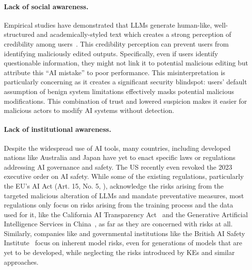 \paragraph{Lack of social awareness.}
Empirical studies have demonstrated that LLMs generate human-like, well-structured and academically-styled text which creates a strong perception of credibility among users~\cite{kreps2022all,heersmink2024phenomenology,wester2024exploring}. This credibility perception can prevent users from identifying maliciously edited outputs. Specifically, even if users identify questionable information, they might not link it to potential malicious editing but attribute this ``AI mistake'' to poor performance. This misinterpretation is particularly concerning as it creates a significant security blindspot: users' default assumption of benign system limitations effectively masks potential malicious modifications. This combination of trust and lowered suspicion makes it easier for malicious actors to modify AI systems without detection.







\paragraph{Lack of institutional awareness.} 
Despite the widespread use of AI tools, many countries, including developed nations like Australia and Japan have yet to enact specific laws or regulations addressing AI governance and safety. The US recently even revoked the 2023 executive order on AI safety. While some of the existing regulations, particularly the EU's AI Act (Art. 15, No. 5, \citet{eu_ai_act_2024}), acknowledge the risks arising from the targeted malicious alteration of LLMs and mandate preventative measures, most regulations only focus on risks arising from the training process and the data used for it, like the California AI Transparency Act~\cite{california_sb942_2024} and the Generative Artificial Intelligence Services in China~\cite{china2023}, as far as they are concerned with risks at all. Similarly, companies like \citet{anthropic_scaling2024} and governmental institutions like the British AI Safety Institute~\cite{aisi2024} focus on inherent model risks, even for generations of models that are yet to be developed, while neglecting the risks introduced by KEs and similar approaches.






